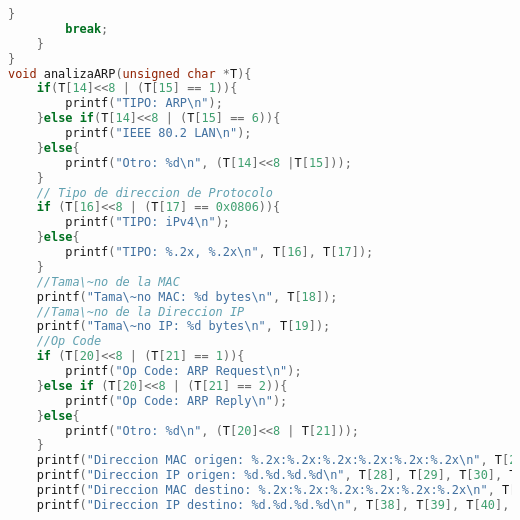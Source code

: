 \begin{lstlisting}[language={C}, caption={Analizador de tramas en C}, label={Script}]
        }
        break;
    }
}
void analizaARP(unsigned char *T){
    if(T[14]<<8 | (T[15] == 1)){
        printf("TIPO: ARP\n");
    }else if(T[14]<<8 | (T[15] == 6)){
        printf("IEEE 80.2 LAN\n");
    }else{
        printf("Otro: %d\n", (T[14]<<8 |T[15]));
    }
    // Tipo de direccion de Protocolo
    if (T[16]<<8 | (T[17] == 0x0806)){
        printf("TIPO: iPv4\n");
    }else{
        printf("TIPO: %.2x, %.2x\n", T[16], T[17]);
    }
    //Tama\~no de la MAC
    printf("Tama\~no MAC: %d bytes\n", T[18]);
    //Tama\~no de la Direccion IP
    printf("Tama\~no IP: %d bytes\n", T[19]);
    //Op Code
    if (T[20]<<8 | (T[21] == 1)){
        printf("Op Code: ARP Request\n");
    }else if (T[20]<<8 | (T[21] == 2)){
        printf("Op Code: ARP Reply\n");
    }else{
        printf("Otro: %d\n", (T[20]<<8 | T[21]));
    }
    printf("Direccion MAC origen: %.2x:%.2x:%.2x:%.2x:%.2x:%.2x\n", T[22], T[23], T[24], T[25], T[26], T[27]);
    printf("Direccion IP origen: %d.%d.%d.%d\n", T[28], T[29], T[30], T[31]);
    printf("Direccion MAC destino: %.2x:%.2x:%.2x:%.2x:%.2x:%.2x\n", T[32], T[33], T[34], T[35], T[36], T[37]);
    printf("Direccion IP destino: %d.%d.%d.%d\n", T[38], T[39], T[40], T[41]);
    

\end{lstlisting}
